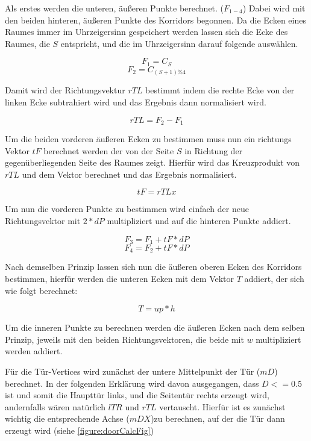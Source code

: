 Als erstes werden die unteren, äußeren Punkte berechnet. ($F_{1-4}$)
Dabei wird mit den beiden hinteren, äußeren Punkte des Korridors begonnen. Da die Ecken eines Raumes immer im Uhrzeigersinn gespeichert werden lassen sich die Ecke des Raumes, die $S$ entspricht, und die im Uhrzeigersinn darauf folgende auswählen. %

$$ F_1 = C_S $$
$$ F_2 = C_{(S+1) \% 4} $$ %

Damit wird der Richtungsvektur $rTL$ bestimmt indem die rechte Ecke von der linken Ecke subtrahiert wird und das Ergebnis dann normalisiert wird.

$$ rTL = F_2 - F_1 $$ %

Um die beiden vorderen äußeren Ecken zu bestimmen muss nun ein richtungs Vektor $tF$ berechnet werden der von der Seite $S$ in Richtung der gegenüberliegenden Seite des Raumes zeigt. Hierfür wird das Kreuzprodukt von $rTL$ und dem Vektor
berechnet und das Ergebnis normalisiert.

$$ tF = rTL x $$ %

Um nun die vorderen Punkte zu bestimmen wird einfach der neue Richtungsvektor mit $2 * dP$ multipliziert und auf die hinteren Punkte addiert.

$$F_3 = F_1 + tF * dP $$
$$F_4 = F_2 + tF * dP $$

Nach demselben Prinzip lassen sich nun die äußeren oberen Ecken des Korridors bestimmen, hierfür werden die unteren Ecken mit dem Vektor $T$ addiert, der sich wie folgt berechnet:

$$T = up * h $$ %

Um die inneren Punkte zu berechnen werden die äußeren Ecken nach dem selben Prinzip, jeweils mit den beiden Richtungsvektoren, die beide mit $w$ multipliziert werden addiert.


\begin{figure}[H]
    \centering
    
    \caption{} %
    \label{figure:doorCalcFig}
\end{figure}

Für die Tür-Vertices wird zunächst der untere Mittelpunkt der Tür ($mD$) berechnet.
In der folgenden Erklärung wird davon ausgegangen, dass $D <= 0.5$ ist und somit die Haupttür links, und die Seitentür rechts erzeugt wird, andernfalls  wären natürlich $lTR$ und $rTL$ vertauscht.
Hierfür ist es zunächst wichtig die entsprechende Achse ($mDX$)zu berechnen, auf der die Tür dann erzeugt wird (siehe \autoref{figure:doorCalcFig})

